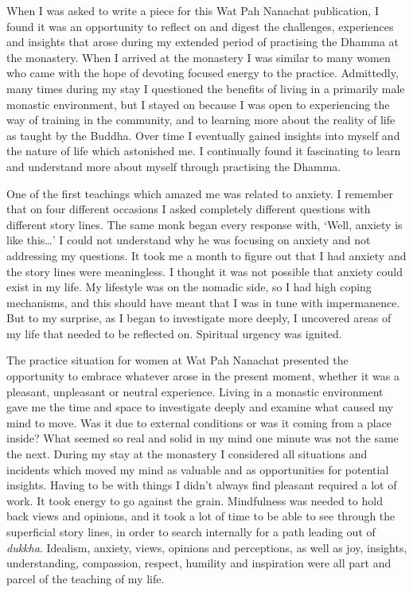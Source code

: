 
When I was asked to write a piece for this Wat Pah Nanachat publication,
I found it was an opportunity to reflect on and digest the challenges,
experiences and insights that arose during my extended period of
practising the Dhamma at the monastery. When I arrived at the monastery
I was similar to many women who came with the hope of devoting focused
energy to the practice. Admittedly, many times during my stay I
questioned the benefits of living in a primarily male monastic
environment, but I stayed on because I was open to experiencing the way
of training in the community, and to learning more about the reality of
life as taught by the Buddha. Over time I eventually gained insights
into myself and the nature of life which astonished me. I continually
found it fascinating to learn and understand more about myself through
practising the Dhamma.

One of the first teachings which amazed me was related to anxiety. I
remember that on four different occasions I asked completely different
questions with different story lines. The same monk began every response
with, `Well, anxiety is like this\ldots{}' I could not understand why he
was focusing on anxiety and not addressing my questions. It took me a
month to figure out that I had anxiety and the story lines were
meaningless. I thought it was not possible that anxiety could exist in
my life. My lifestyle was on the nomadic side, so I had high coping
mechanisms, and this should have meant that I was in tune with
impermanence. But to my surprise, as I began to investigate more deeply,
I uncovered areas of my life that needed to be reflected on. Spiritual
urgency was ignited.

The practice situation for women at Wat Pah Nanachat presented the
opportunity to embrace whatever arose in the present moment, whether it
was a pleasant, unpleasant or neutral experience. Living in a monastic
environment gave me the time and space to investigate deeply and examine
what caused my mind to move. Was it due to external conditions or was it
coming from a place inside? What seemed so real and solid in my mind one
minute was not the same the next. During my stay at the monastery I
considered all situations and incidents which moved my mind as valuable
and as opportunities for potential insights. Having to be with things I
didn't always find pleasant required a lot of work. It took energy to go
against the grain. Mindfulness was needed to hold back views and
opinions, and it took a lot of time to be able to see through the
superficial story lines, in order to search internally for a path
leading out of \emph{dukkha}. Idealism, anxiety, views, opinions and
perceptions, as well as joy, insights, understanding, compassion,
respect, humility and inspiration were all part and parcel of the
teaching of my life.

